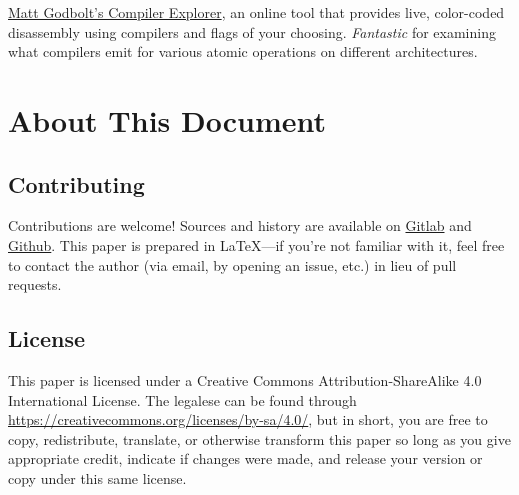 \documentclass[fontsize=10pt, numbers=endperiod]{scrartcl}
\begin{document}
\begin{center}
\begin{minipage}{0.7\linewidth}
\href{https://godbolt.org/}{Matt Godbolt's Compiler Explorer},
an online tool that provides live, color-coded disassembly using compilers and
flags of your choosing.
\emph{Fantastic} for examining what compilers emit for various
atomic operations on different architectures.

\section{About This Document}

\subsection{Contributing}

Contributions are welcome!
Sources and history are available on
\href{https://gitlab.com/mrkline/concurrency-primer}{Gitlab}
and
\href{https://github.com/mrkline/concurrency-primer}{Github}.
This paper is prepared in \LaTeX{}---if you're not familiar with it,
feel free to contact the author
(via email, by opening an issue, etc.)
in lieu of pull requests.

\subsection{License}

This paper is licensed under a
Creative Commons Attribution-ShareAlike 4.0 International License.
The legalese can be found through
\url{https://creativecommons.org/licenses/by-sa/4.0/},
but in short,
you are free to copy, redistribute, translate, or otherwise transform this paper
so long as you give appropriate credit, indicate if changes were made,
and release your version or copy under this same license.

\end{minipage}
\end{center}
\end{document}
